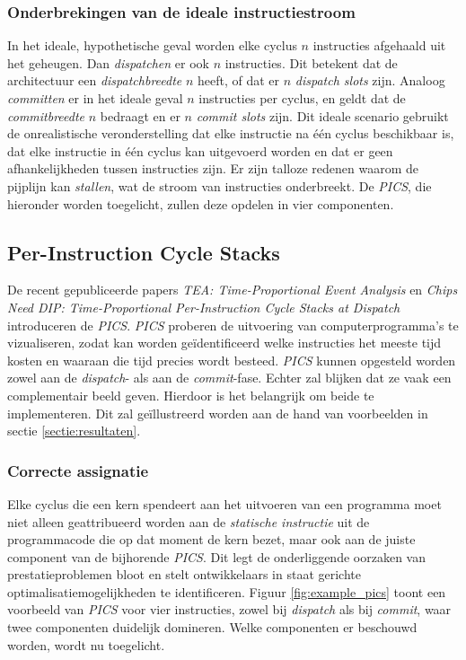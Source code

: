 \documentclass[12pt,a4paper,faculty=ea,language=nl]{ugent-doc}
\begin{document}
\subsubsection{Onderbrekingen van de ideale instructiestroom}
In het ideale, hypothetische geval worden elke cyclus \(n\) instructies afgehaald uit het geheugen. Dan \textit{dispatchen} er ook \(n\) instructies. Dit betekent dat de architectuur een \textit{dispatchbreedte} \(n\) heeft, of dat er \(n\) \textit{dispatch slots} zijn. Analoog \textit{committen} er in het ideale geval \(n\) instructies per cyclus, en geldt dat de \textit{commitbreedte} \(n\) bedraagt en er \(n\) \textit{commit slots} zijn. Dit ideale scenario gebruikt de onrealistische veronderstelling dat elke instructie na één cyclus beschikbaar is, dat elke instructie in één cyclus kan uitgevoerd worden en dat er geen afhankelijkheden tussen instructies zijn. Er zijn talloze redenen waarom de pijplijn kan \textit{stallen}, wat de stroom van instructies onderbreekt. De \textit{PICS}, die hieronder worden toegelicht, zullen deze opdelen in vier componenten.

\subsection{Per-Instruction Cycle Stacks}
De recent gepubliceerde papers \textit{TEA: Time-Proportional Event Analysis} \cite{tea2023} en \textit{Chips Need DIP: Time-Proportional Per-Instruction Cycle Stacks at Dispatch} \cite{dip2026} introduceren de \textit{PICS}. \textit{PICS} proberen de uitvoering van computerprogramma's te vizualiseren, zodat kan worden geïdentificeerd welke instructies het meeste tijd kosten en waaraan die tijd precies wordt besteed. \textit{PICS} kunnen opgesteld worden zowel aan de \textit{dispatch}- als aan de \textit{commit}-fase. Echter zal blijken dat ze vaak een complementair beeld geven. Hierdoor is het belangrijk om beide te implementeren. Dit zal geïllustreerd worden aan de hand van voorbeelden in sectie \ref{sectie:resultaten}.

\subsubsection{Correcte assignatie}
Elke cyclus die een kern spendeert aan het uitvoeren van een programma moet niet alleen geattribueerd worden aan de \textit{statische instructie} uit de programmacode die op dat moment de kern bezet, maar ook aan de juiste component van de bijhorende \textit{PICS}. Dit legt de onderliggende oorzaken van prestatieproblemen bloot en stelt ontwikkelaars in staat gerichte optimalisatiemogelijkheden te identificeren. Figuur \ref{fig:example_pics} toont een voorbeeld van \textit{PICS} voor vier instructies, zowel bij \textit{dispatch} als bij \textit{commit}, waar twee componenten duidelijk domineren. Welke componenten er beschouwd worden, wordt nu toegelicht.
\end{document}
